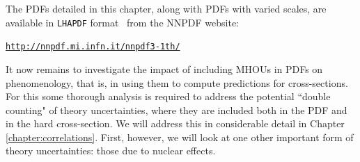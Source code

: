 The PDFs detailed in this chapter, along with PDFs with varied scales, are available in {\tt LHAPDF} format~\cite{Buckley:2014ana} from the NNPDF website:

\begin{center}
 \href{http://nnpdf.mi.infn.it/nnpdf3-1th/}{\tt http://nnpdf.mi.infn.it/nnpdf3-1th/}
\end{center}

It now remains to investigate the impact of including MHOUs in PDFs on phenomenology, that is, in using them to compute predictions for cross-sections. For this some thorough analysis is required to address the potential ``double counting" of theory uncertainties, where they are included both in the PDF and in the hard cross-section. We will address this in considerable detail in Chapter \ref{chapter:correlations}. First, however, we will look at one other important form of theory uncertainties: those due to nuclear effects.